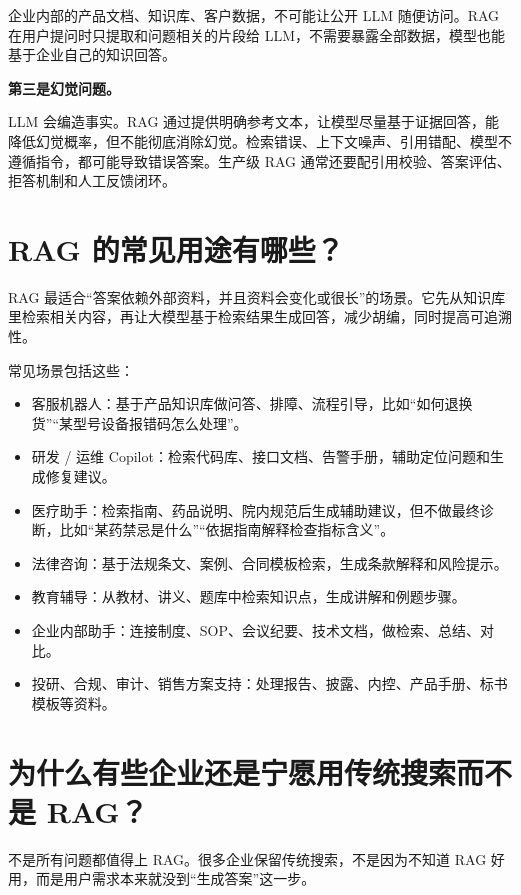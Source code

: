 \documentclass[9pt,a4paper,twocolumn]{ctexart}
\begin{document}
企业内部的产品文档、知识库、客户数据，不可能让公开 LLM 随便访问。RAG 在用户提问时只提取和问题相关的片段给 LLM，不需要暴露全部数据，模型也能基于企业自己的知识回答。



\textbf{第三是幻觉问题。}



LLM 会编造事实。RAG 通过提供明确参考文本，让模型尽量基于证据回答，能降低幻觉概率，但不能彻底消除幻觉。检索错误、上下文噪声、引用错配、模型不遵循指令，都可能导致错误答案。生产级 RAG 通常还要配引用校验、答案评估、拒答机制和人工反馈闭环。



\section*{RAG 的常见用途有哪些？}


RAG 最适合“答案依赖外部资料，并且资料会变化或很长”的场景。它先从知识库里检索相关内容，再让大模型基于检索结果生成回答，减少胡编，同时提高可追溯性。



常见场景包括这些：


\begin{itemize}[itemsep=1pt, topsep=2pt]
  \item 客服机器人：基于产品知识库做问答、排障、流程引导，比如“如何退换货”“某型号设备报错码怎么处理”。
  \item 研发 / 运维 Copilot：检索代码库、接口文档、告警手册，辅助定位问题和生成修复建议。
  \item 医疗助手：检索指南、药品说明、院内规范后生成辅助建议，但不做最终诊断，比如“某药禁忌是什么”“依据指南解释检查指标含义”。
  \item 法律咨询：基于法规条文、案例、合同模板检索，生成条款解释和风险提示。
  \item 教育辅导：从教材、讲义、题库中检索知识点，生成讲解和例题步骤。
  \item 企业内部助手：连接制度、SOP、会议纪要、技术文档，做检索、总结、对比。
  \item 投研、合规、审计、销售方案支持：处理报告、披露、内控、产品手册、标书模板等资料。
\end{itemize}


\section*{为什么有些企业还是宁愿用传统搜索而不是 RAG？}


不是所有问题都值得上 RAG。很多企业保留传统搜索，不是因为不知道 RAG 好用，而是用户需求本来就没到“生成答案”这一步。
\end{document}
